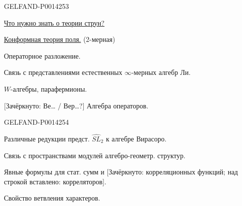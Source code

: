 \begin{GelfandAdjacentEvidence}{GELFAND-P001425}{3}


\qquad \uline{Что нужно знать о теории струн?}

\uline{Конформная теория поля.} \quad (2-мерная)

Операторное разложение.

Связь с представлениями естественных \(\infty\)-мерных алгебр Ли.

\(W\)-алгебры, парафермионы.

[Зачёркнуто: Ве\ldots{} / Вер\ldots{}?] Алгебра  операторов.
\end{GelfandAdjacentEvidence}
\begin{GelfandAdjacentEvidence}{GELFAND-P001425}{4}

\end{GelfandAdjacentEvidence}


Различные редукции предст. \(\widehat{SL}_2\) к алгебре Вирасоро.

Связь с пространствами модулей алгебро-геометр. структур.

Явные формулы для стат. сумм и [Зачёркнуто: корреляционных функций; над строкой вставлено: корреляторов].

Свойство ветвления характеров.


